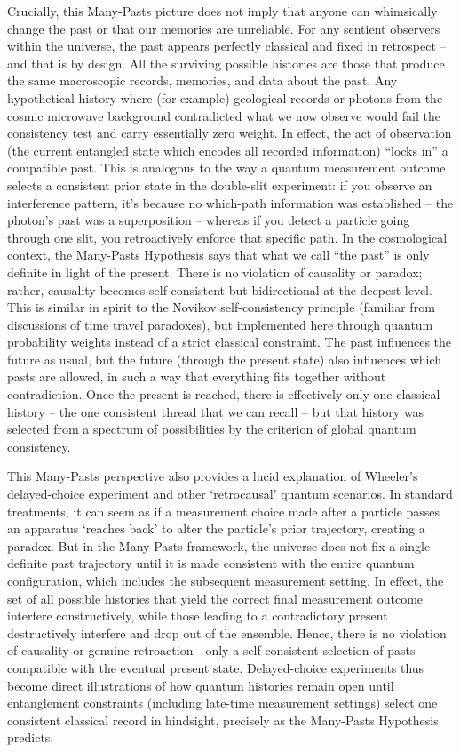 \documentclass[11pt]{article}
\begin{document}
Crucially, this Many-Pasts picture does not imply that anyone can whimsically change the past or that our memories are unreliable. For any sentient observers within the universe, the past appears perfectly classical and fixed in retrospect – and that is by design. All the surviving possible histories are those that produce the same macroscopic records, memories, and data about the past. Any hypothetical history where (for example) geological records or photons from the cosmic microwave background contradicted what we now observe would fail the consistency test and carry essentially zero weight. In effect, the act of observation (the current entangled state which encodes all recorded information) “locks in” a compatible past. This is analogous to the way a quantum measurement outcome selects a consistent prior state in the double-slit experiment: if you observe an interference pattern, it’s because no which-path information was established – the photon’s past was a superposition – whereas if you detect a particle going through one slit, you retroactively enforce that specific path. In the cosmological context, the Many-Pasts Hypothesis says that what we call “the past” is only definite in light of the present. There is no violation of causality or paradox; rather, causality becomes self-consistent but bidirectional at the deepest level. This is similar in spirit to the Novikov self-consistency principle (familiar from discussions of time travel paradoxes), but implemented here through quantum probability weights instead of a strict classical constraint. The past influences the future as usual, but the future (through the present state) also influences which pasts are allowed, in such a way that everything fits together without contradiction. Once the present is reached, there is effectively only one classical history – the one consistent thread that we can recall – but that history was selected from a spectrum of possibilities by the criterion of global quantum consistency.

This Many-Pasts perspective also provides a lucid explanation of Wheeler’s delayed-choice experiment and other ‘retrocausal’ quantum scenarios. In standard treatments, it can seem as if a measurement choice made after a particle passes an apparatus ‘reaches back’ to alter the particle’s prior trajectory, creating a paradox. But in the Many-Pasts framework, the universe does not fix a single definite past trajectory until it is made consistent with the entire quantum configuration, which includes the subsequent measurement setting. In effect, the set of all possible histories that yield the correct final measurement outcome interfere constructively, while those leading to a contradictory present destructively interfere and drop out of the ensemble. Hence, there is no violation of causality or genuine retroaction—only a self-consistent selection of pasts compatible with the eventual present state. Delayed-choice experiments thus become direct illustrations of how quantum histories remain open until entanglement constraints (including late-time measurement settings) select one consistent classical record in hindsight, precisely as the Many-Pasts Hypothesis predicts.
\end{document}
